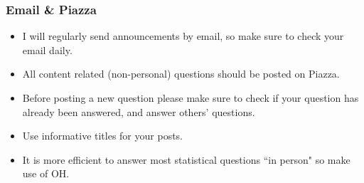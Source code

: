 \documentclass[11pt,containsverbatim,handout,xcolor=xelatex,dvipsnames,table]{beamer}
\begin{document}
\begin{frame}
\frametitle{Email \& Piazza}

\begin{itemize}

\item I will regularly send announcements by email, so make sure to check your email  
daily.

\item All content related (non-personal) questions should be posted on Piazza.

\item Before posting a new question please make sure to check if your question has 
already been answered, and answer others' questions.

\item Use informative titles for your posts.

\item It is more efficient to answer most statistical questions ``in person" so make 
use of OH.

\end{itemize}


\end{frame}

\end{document}
